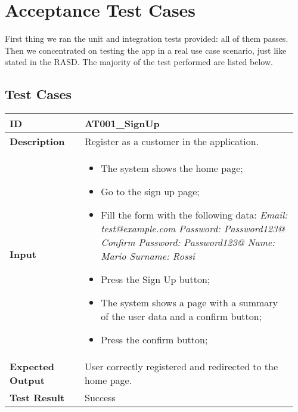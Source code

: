 \chapter{Acceptance Test Cases}
First thing we ran the unit and integration tests provided: all of them passes.\newline
Then we concentrated on testing the app in a real use case scenario, just like stated in the RASD. The majority of the test performed are listed below.

\section{Test Cases}

\begin{table}[H]
	\centering
	\begin{tabular}{@{}p{0.25\linewidth}p{0.71\linewidth}@{}}
		\toprule
		\textbf{ID} & AT001\_SignUp \\
		\midrule
		\textbf{Description} & Register as a customer in the application. \\
		\midrule
		\textbf{Input} & \begin{itemize}[leftmargin=.4cm,noitemsep,topsep=0pt,before=\vspace{-3mm},after=\vspace{-4mm}]
			\item The system shows the home page;
			\item Go to the sign up page;
			\item Fill the form with the following data:\newline
			  \textit{Email: test@example.com\newline
			  Password: Password123@\newline
			  Confirm Password: Password123@\newline
			  Name: Mario\newline
			  Surname: Rossi}
			\item Press the Sign Up button;
			\item The system shows a page with a summary of the user data and a confirm button;
			\item Press the confirm button;
		\end{itemize}\\
		\midrule
		\textbf{Expected Output} & User correctly registered and redirected to the home page.\\
		\midrule
		\textbf{Test Result} & Success\\
		\bottomrule
	\end{tabular}
\end{table}

